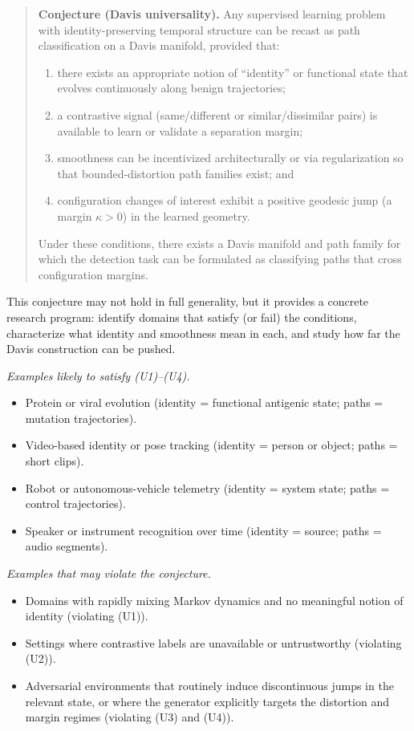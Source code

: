 \documentclass[11pt]{article}
\begin{document}
\begin{quote}
\textbf{Conjecture (Davis universality).}%
\quad
Any supervised learning problem with identity-preserving temporal structure can be recast as path
classification on a Davis manifold, provided that:
\begin{enumerate}[label=(U\arabic*), topsep=2pt,leftmargin=1.5em]
  \item there exists an appropriate notion of ``identity'' or functional state that evolves continuously
        along benign trajectories;
  \item a contrastive signal (same/different or similar/dissimilar pairs) is available to learn or validate
        a separation margin;
  \item smoothness can be incentivized architecturally or via regularization so that bounded-distortion
        path families exist; and
  \item configuration changes of interest exhibit a positive geodesic jump (a margin $\kappa > 0$)
        in the learned geometry.
\end{enumerate}
Under these conditions, there exists a Davis manifold and path family for which the detection task
can be formulated as classifying paths that cross configuration margins.
\end{quote}

This conjecture may not hold in full generality, but it provides a concrete research program: identify
domains that satisfy (or fail) the conditions, characterize what identity and smoothness mean in
each, and study how far the Davis construction can be pushed.

\medskip\noindent
\emph{Examples likely to satisfy (U1)--(U4).}
\begin{itemize}[leftmargin=1.6em,itemsep=2pt,topsep=2pt]
  \item Protein or viral evolution (identity = functional antigenic state; paths = mutation trajectories).
  \item Video-based identity or pose tracking (identity = person or object; paths = short clips).
  \item Robot or autonomous-vehicle telemetry (identity = system state; paths = control trajectories).
  \item Speaker or instrument recognition over time (identity = source; paths = audio segments).
\end{itemize}

\noindent
\emph{Examples that may violate the conjecture.}
\begin{itemize}[leftmargin=1.6em,itemsep=2pt,topsep=2pt]
  \item Domains with rapidly mixing Markov dynamics and no meaningful notion of identity
        (violating (U1)).
  \item Settings where contrastive labels are unavailable or untrustworthy (violating (U2)).
  \item Adversarial environments that routinely induce discontinuous jumps in the relevant state,
        or where the generator explicitly targets the distortion and margin regimes (violating (U3)
        and (U4)).
\end{itemize}
\end{document}
